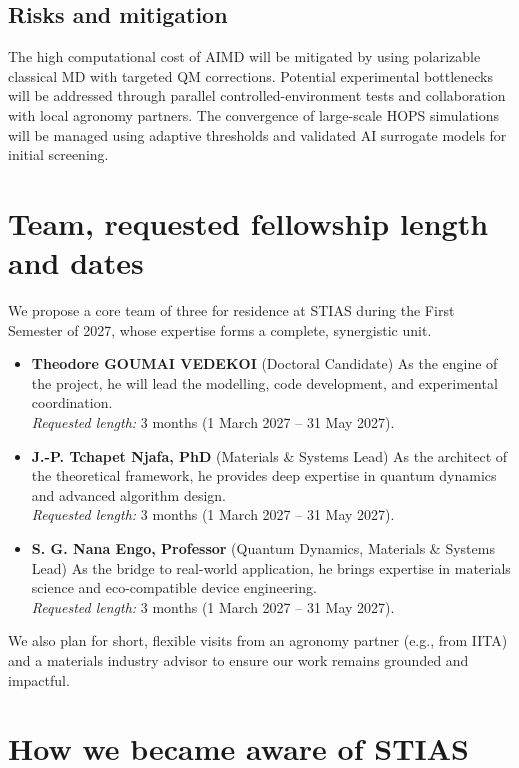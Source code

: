 \documentclass[11pt,a4paper]{article}
\begin{document}
\subsection*{Risks and mitigation}

The high computational cost of AIMD will be mitigated by using polarizable classical MD with targeted QM corrections. Potential experimental bottlenecks will be addressed through parallel controlled-environment tests and collaboration with local agronomy partners. The convergence of large-scale HOPS simulations will be managed using adaptive thresholds and validated AI surrogate models for initial screening.

\section*{Team, requested fellowship length and dates}

We propose a core team of three for residence at STIAS during the First Semester of 2027, whose expertise forms a complete, synergistic unit.
\begin{itemize}
  \item \textbf{Theodore GOUMAI VEDEKOI} (Doctoral Candidate) As the engine of the project, he will lead the modelling, code development, and experimental coordination.
    \\ \textit{Requested length:} 3 months (1 March 2027 -- 31 May 2027).
  \item \textbf{J.-P. Tchapet Njafa, PhD} (Materials \& Systems Lead) As the architect of the theoretical framework, he provides deep expertise in quantum dynamics and advanced algorithm design.
    \\ \textit{Requested length:} 3 months (1 March 2027 -- 31 May 2027).
  \item \textbf{S. G. Nana Engo, Professor} (Quantum Dynamics, Materials \& Systems Lead) As the bridge to real-world application, he brings expertise in materials science and eco-compatible device engineering.
    \\ \textit{Requested length:} 3 months (1 March 2027 -- 31 May 2027).
\end{itemize}
We also plan for short, flexible visits from an agronomy partner (e.g., from IITA) and a materials industry advisor to ensure our work remains grounded and impactful.

\section*{How we became aware of STIAS}
\end{document}
